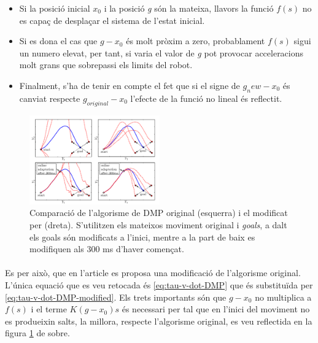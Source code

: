 \documentclass[12pt,a4paper,final,twoside]{article}
\begin{document}
\begin{itemize}
\item Si la posició inicial $x_0$ i la posició \textit{g} són la mateixa, llavors la funció $f(s)$ no es capaç de desplaçar el sistema de l'estat inicial.

\item Si es dona el cas que $g-x_0$ és molt pròxim a zero, probablament $f(s)$ sigui un numero elevat, per tant, si varia el valor de \textit{g} pot provocar acceleracions molt grans que sobrepassi els limits del robot.

\item Finalment, s'ha de tenir en compte el fet que si el signe de $g_new - x_0$ és canviat respecte $g_{original} - x_0$ l'efecte de la funció no lineal és reflectit.
\end{itemize}
\begin{figure}
\centering
\includegraphics[width=0.5\textwidth]{Imatges/DMP-modified-algorism}
\caption[Comparació de l'algorisme de DMP original (esquerra) i el modificat  per \cite{Pastor2009a} (dreta)]{Comparació de l'algorisme de DMP original (esquerra) i el modificat  per \cite{Pastor2009a} (dreta). S'utilitzen els mateixos moviment original i \textit{goals}, a dalt els goals són modificats a l'inici, mentre a la part de baix es modifiquen als 300 ms d'haver començat.}
\label{fig:DMP-modified-algorism}
\end{figure}

\paragraph{}Es per això, que en l'article \cite{Pastor2009a} es proposa una modificació de l'algorisme original. L'única equació que es veu retocada és \eqref{eq:tau-v-dot-DMP} que és substituïda per \eqref{eq:tau-v-dot-DMP-modified}. Els trets importants són que $g - x_0$ no multiplica a $f(s)$ i el terme $K(g - x_0)s$ és necessari per tal que en l'inici del moviment no es produeixin salts, la millora, respecte l'algorisme original, es veu reflectida en la figura \ref{fig:DMP-modified-algorism} de sobre.
\end{document}
